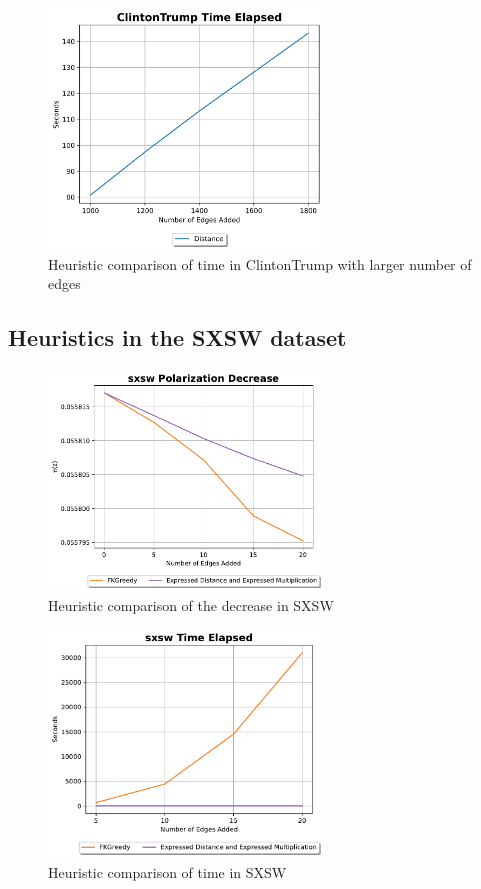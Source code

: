 \begin{figure}[H]
	\centering
	\includegraphics[width=0.65\textwidth]{Figures/ClintonTrump Time Elapsed 2}
	\caption{Heuristic comparison of time in ClintonTrump with larger number of edges}
	\label{fig:ClintonTrump_time}
\end{figure}
\clearpage


\subsection{Heuristics in the SXSW dataset}
\begin{figure}[H]
	\centering
	\includegraphics[width=0.65\textwidth]{Figures/sxsw Polarization Decrease}
	\caption{Heuristic comparison of the decrease in SXSW}
	\label{fig:sxsw_pol}
\end{figure}


\begin{figure}[H]
	\centering
	\includegraphics[width=0.65\textwidth]{Figures/sxsw Time Elapsed}
	\caption{Heuristic comparison of time in SXSW}
	\label{fig:sxsw_time}
\end{figure}

